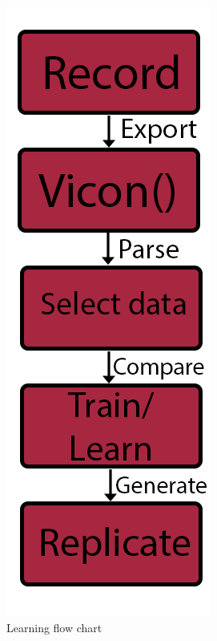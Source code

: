\begin{figure}[h!]
    \begin{subfigure}{0.4\linewidth} 
        \centering
        \captionsetup{justification=centering}
        \centerline{
        \includegraphics[scale=0.25]{images/software/flowchart.png}}
        \caption{Learning flow chart}
        \label{fig:flowchart}
    \end{subfigure}
    \begin{subfigure}{0.4\linewidth} 
        \centering
        \captionsetup{justification=centering}
        \centerline{
}
\end{subfigure}
\end{figure}

